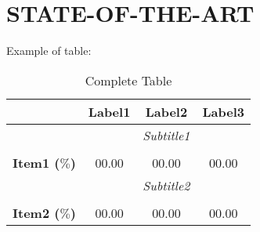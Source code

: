 
\setcounter{chapter}{2} 



\chapter{STATE-OF-THE-ART}\label{ch:state}
Example of table:
\begin{table}[h]
	\begin{center} {\footnotesize
			\begin{tabular}{llll}
				\hline
				\multicolumn{1}{c}{}   & \multicolumn{1}{c}{\textbf{Label1}} & \multicolumn{1}{c}{\textbf{Label2}} & 
				\multicolumn{1}{c}{\textbf{Label3}} \\
				\hline
				\multicolumn{1}{c}{} & \multicolumn{1}{c}{}& \multicolumn{1}{c}{\textit{Subtitle1}}&\multicolumn{1}{c}{}\\
				\multicolumn{1}{c}{} & \multicolumn{1}{c}{}& \multicolumn{1}{c}{}&\multicolumn{1}{c}{}\\
				\multicolumn{1}{c}{\textbf{Item1 ($\%$)}} & \multicolumn{1}{c}{00.00}     & \multicolumn{1}{c}{00.00}         & \multicolumn{1}{c}{00.00}    \\
				
				
				\multicolumn{1}{c}{} & \multicolumn{1}{c}{}& \multicolumn{1}{c}{\textit{Subtitle2}}&\multicolumn{1}{c}{}\\
				\multicolumn{1}{c}{} & \multicolumn{1}{c}{}& \multicolumn{1}{c}{}&\multicolumn{1}{c}{}\\
				\multicolumn{1}{c}{\textbf{Item2 ($\%$)}} & \multicolumn{1}{c}{00.00}     & \multicolumn{1}{c}{00.00}         & \multicolumn{1}{c}{00.00}    \\
		\end{tabular}}   
	\end{center}
	\caption{\footnotesize Complete Table}	\label{hybridTable}
\end{table}


